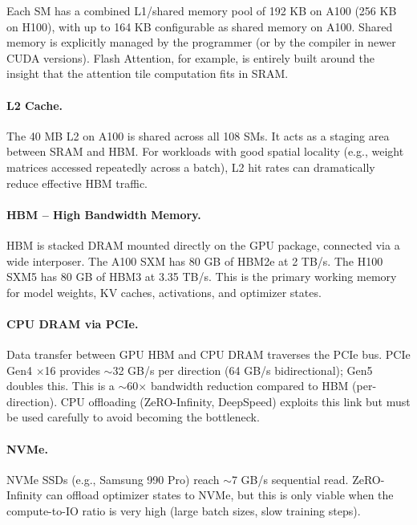 Each SM has a combined L1/shared memory pool of 192 KB on A100 (256 KB on H100), with up to 164 KB configurable as shared memory on A100. Shared memory is explicitly managed by the programmer (or by the compiler in newer CUDA versions). Flash Attention, for example, is entirely built around the insight that the attention tile computation fits in SRAM.

\paragraph{L2 Cache.}
\label{l2-cache.}

The 40 MB L2 on A100 is shared across all 108 SMs. It acts as a staging area between SRAM and HBM. For workloads with good spatial locality (e.g., weight matrices accessed repeatedly across a batch), L2 hit rates can dramatically reduce effective HBM traffic.

\paragraph{HBM -- High Bandwidth Memory.}
\label{hbm-high-bandwidth-memory.}

HBM is stacked DRAM mounted directly on the GPU package, connected via a wide interposer. The A100 SXM has 80 GB of HBM2e at 2 TB/s. The H100 SXM5 has 80 GB of HBM3 at 3.35 TB/s. This is the primary working memory for model weights, KV caches, activations, and optimizer states.

\paragraph{CPU DRAM via PCIe.}
\label{cpu-dram-via-pcie.}

Data transfer between GPU HBM and CPU DRAM traverses the PCIe bus. PCIe Gen4 $\times$16 provides $\sim$32 GB/s per direction (64 GB/s bidirectional); Gen5 doubles this. This is a $\sim$60$\times$ bandwidth reduction compared to HBM (per-direction). CPU offloading (ZeRO-Infinity, DeepSpeed) exploits this link but must be used carefully to avoid becoming the bottleneck.

\paragraph{NVMe.}
\label{nvme.}

NVMe SSDs (e.g., Samsung 990 Pro) reach $\sim$7 GB/s sequential read. ZeRO-Infinity can offload optimizer states to NVMe, but this is only viable when the compute-to-IO ratio is very high (large batch sizes, slow training steps).

